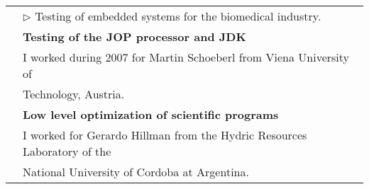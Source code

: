 \documentclass[a4paper,11pt,english]{article}
\begin{document}
\begin{tabular}{ p{2cm} l }
			& 	$\triangleright$ Testing of embedded systems for the biomedical industry.\\
			& 	{\bf Testing of the JOP processor and JDK}\\
			& 	I worked during 2007 for Martin Schoeberl from Viena University of\\
			&	Technology,	Austria.\\
			& 	{\bf Low level optimization of scientific programs}\\
			& 	I worked for Gerardo Hillman from the Hydric Resources Laboratory of the\\
			& 	National University of Cordoba at Argentina.\\
				
\end{tabular} 
\\\\
\end{document}
